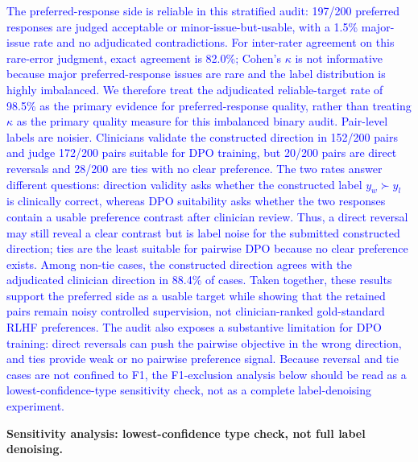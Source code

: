 \documentclass[12pt]{article}
\newcommand{\added}[1]{\textcolor{blue}{#1}}
\begin{document}
\begin{displayquote}
\added{The preferred-response side is reliable in this stratified audit: 197/200 preferred
responses are judged acceptable or minor-issue-but-usable, with a 1.5\%
major-issue rate and no adjudicated contradictions. For inter-rater agreement on
this rare-error judgment, exact agreement is 82.0\%; Cohen's $\kappa$ is not
informative because major preferred-response issues are rare and the label
distribution is highly imbalanced. We therefore treat the adjudicated
reliable-target rate of 98.5\% as the primary evidence for preferred-response
quality, rather than treating $\kappa$ as the primary quality measure for this
imbalanced binary audit. Pair-level labels are noisier.
Clinicians validate the constructed direction in 152/200 pairs and judge 172/200
pairs suitable for DPO training, but 20/200 pairs are direct reversals and 28/200
are ties with no clear preference. The two rates answer different questions:
direction validity asks whether the constructed label $y_w \succ y_l$ is
clinically correct, whereas DPO suitability asks whether the two responses
contain a usable preference contrast after clinician review. Thus, a direct
reversal may still reveal a clear contrast but is label noise for the submitted
constructed direction; ties are the least suitable for pairwise DPO because no
clear preference exists. Among non-tie cases, the constructed direction agrees
with the adjudicated clinician direction in 88.4\% of cases. Taken together,
these results support the preferred side as a usable target while showing that
the retained pairs remain noisy controlled supervision, not clinician-ranked
gold-standard RLHF preferences. The audit also exposes a substantive limitation
for DPO training: direct reversals can push the pairwise objective in the wrong
direction, and ties provide weak or no pairwise preference signal. Because
reversal and tie cases are not confined to F1, the F1-exclusion analysis below
should be read as a lowest-confidence-type sensitivity check, not as a complete
label-denoising experiment.}
\end{displayquote}

\textbf{Sensitivity analysis: lowest-confidence type check, not full label denoising.}
\end{document}

